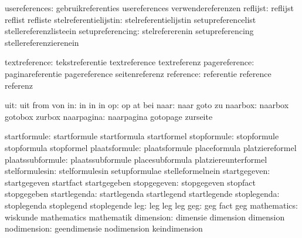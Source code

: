                usereferences:  gebruikreferenties           usereferences
                                verwendereferenzen
                     reflijst:  reflijst                     reflist
                                refliste
        stelreferentielijstin:  stelreferentielijstin        setupreferencelist
                                stellereferenzlisteein
             setupreferencing:  stelrefererenin              setupreferencing
                                stellereferenzierenein

                textreference:  tekstreferentie              textreference
                                textreferenz
                pagereference:  paginareferentie             pagereference
                                seitenreferenz
                    reference:  referentie                   reference
                                referenz

                          uit:  uit                          from
                                von
                           in:  in                           in
                                in
                           op:  op                           at
                                bei
                         naar:  naar                         goto
                                zu
                      naarbox:  naarbox                      gotobox
                                zurbox
                   naarpagina:  naarpagina                   gotopage
                                zurseite %

                 startformule:  startformule                 startformula
                                startformel
                  stopformule:  stopformule                  stopformula
                                stopformel
                plaatsformule:  plaatsformule                placeformula
                                platziereformel
             plaatssubformule:  plaatssubformule             placesubformula
                                platziereunterformel
               stelformulesin:  stelformulesin               setupformulae
                                stelleformelnein
                 startgegeven:  startgegeven                 startfact
                                startgegeben
                  stopgegeven:  stopgegeven                  stopfact
                                stopgegeben
                 startlegenda:  startlegenda                 startlegend
                                startlegende
                  stoplegenda:  stoplegenda                  stoplegend
                                stoplegende
leg: leg leg leg 
geg: geg fact geg
                  mathematics:  wiskunde                     mathematics
                                mathematik
                    dimension:  dimensie                     dimension
                                dimension
                  nodimension:  geendimensie                 nodimension
                                keindimension

